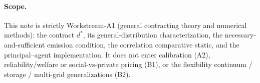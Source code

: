 \documentclass[11pt,reqno]{amsart}
\theoremstyle{plain}
\theoremstyle{definition}
\theoremstyle{remark}
\newcommand{\dstar}{d^{*}}
\begin{document}
\paragraph{Scope.} This note is strictly Workstream-A1 (general contracting theory
and numerical methods): the contract $\dstar$, its general-distribution
characterization, the necessary-and-sufficient emission condition, the correlation
comparative static, and the principal--agent implementation. It does not enter
calibration (A2), reliability/welfare or social-vs-private pricing (B1), or the
flexibility continuum / storage / multi-grid generalizations (B2).
\end{document}
